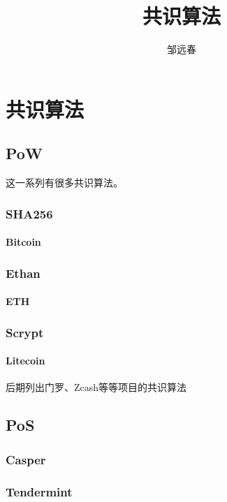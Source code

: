 \documentclass[UTF8]{ctexart}
\title{共识算法}
\author{邹远春}
\date{}
\begin{document}
\maketitle
\else
\chapter{共识算法}
\fi
\section{PoW}

这一系列有很多共识算法。

\subsection{SHA256}

\subsubsection{Bitcoin}

\subsection{Ethan}

\subsubsection{ETH}

\subsection{Scrypt}

\subsubsection{Litecoin}

后期列出门罗、Zcash等等项目的共识算法

\section{PoS}

\subsection{Casper}

\subsection{Tendermint}
\end{document}
